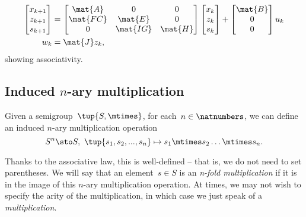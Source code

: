 \begin{equation*}
\label{eq:dlin-7}
\begin{aligned}
\begin{bmatrix}
x_{k+1}\\
z_{k+1}\\
s_{k+1}
\end{bmatrix}&=
\begin{bmatrix}
\mat{A}&0&0\\
\mat{FC}&\mat{E}&0\\
0&\mat{IG}&\mat{H}
\end{bmatrix}\begin{bmatrix} x_k\\ z_k\\ s_k\end{bmatrix}+
\begin{bmatrix}
\mat{B}\\ 0\\ 0
\end{bmatrix}u_k\\
w_k&=\mat{J}z_k,
\end{aligned}
\end{equation*}
showing associativity.

\subsection{Induced $n$-ary multiplication}
Given a semigroup~$\tup{S, \mtimes}$, for each~$n \in \natnumbers$, we can define an induced $n$-ary multiplication operation
\begin{equation*}
  S^n \sto S, \ \tup{s_1, s_2, ..., s_n} \mapsto s_1 \mtimes s_2 \dots \mtimes s_n.
\end{equation*}





Thanks to the associative law, this is well-defined -- that is, we do not need to set parentheses.
We will say that an element~$s \in S$ is an \emph{n-fold multiplication} if it is in the image of this $n$-ary multiplication operation.
At times, we may not wish to specify the arity of the multiplication, in which case we just speak of a \emph{multiplication}.

\begin{comment}
\begin{equation}\label{eq:mora}
\mora
\end{equation}
\begin{equation}\label{eq:morb}
\morb
\end{equation}
\begin{equation}\label{eq:morab}
\mora\then\morb
\end{equation}

\end{comment}
